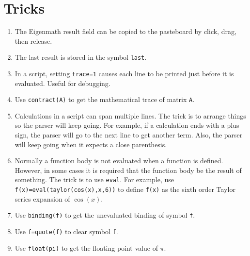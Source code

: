 
\section{Tricks}
\begin{enumerate}

\item
The Eigenmath result field can be copied to the pasteboard by
click, drag, then release.

\item
The last result is stored in the symbol {\tt last}.

\item
In a script, setting {\tt trace=1}
causes each line to be printed just before it is evaluated.
Useful for debugging.

\item
Use {\tt contract(A)} to get the mathematical trace of matrix \verb$A$.

\item
Calculations in a script can span multiple lines.
The trick is to arrange things so the parser will keep going.
For example, if a calculation ends with a plus sign, the parser will go to the next line to get another term.
Also, the parser will keep going when it expects a close parenthesis.

\item
Normally a function body is not evaluated when a function is defined.
However, in some cases it is required that the function body be the result of something.
The trick is to use \verb$eval$.
For example, use \verb$f(x)=eval(taylor(cos(x),x,6))$
to define \verb$f(x)$ as the sixth order Taylor series expansion of $\cos(x)$.

\item
Use \verb$binding(f)$ to get the unevaluated binding of symbol \verb$f$.

\item
Use \verb$f=quote(f)$ to clear symbol \verb$f$.

\item
Use \verb$float(pi)$ to get the floating point value of $\pi$.

\end{enumerate}
